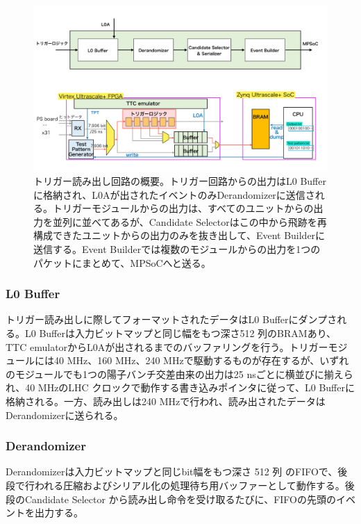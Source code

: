 \begin{figure} 
\centering
\includegraphics[width=16cm]{fig/Test/Readout_Circuite.pdf}
\caption[トリガー読み出し回路の概要]{トリガー読み出し回路の概要。トリガー回路からの出力はL0 Bufferに格納され、L0Aが出されたイベントのみDerandomizerに送信される。トリガーモジュールからの出力は、すべてのユニットからの出力を並列に並べてあるが、Candidate Selectorはこの中から飛跡を再構成できたユニットからの出力のみを抜き出して、Event Builderに送信する。Event Builderでは複数のモジュールからの出力を1つのパケットにまとめて、MPSoCへと送る。}
\label{Readout_Circuite}
\end{figure}

\subsubsection*{L0 Buffer}
    トリガー読み出しに際してフォーマットされたデータはL0 Bufferにダンプされる。L0 Bufferは入力ビットマップと同じ幅をもつ深さ512 列のBRAMあり、TTC emulatorからL0Aが出されるまでのバッファリングを行う。トリガーモジュールには40 MHz、160 MHz、240 MHzで駆動するものが存在するが、いずれのモジュールでも1つの陽子バンチ交差由来の出力は25 nsごとに横並びに揃えられ、40 MHzのLHC クロックで動作する書き込みポインタに従って、L0 Bufferに格納される。一方、読み出しは240 MHzで行われ、読み出されたデータはDerandomizerに送られる。

\subsubsection*{Derandomizer}    
    Derandomizerは入力ビットマップと同じbit幅をもつ深さ 512 列 のFIFOで、後段で行われる圧縮およびシリアル化の処理待ち用バッファーとして動作する。後段のCandidate Selector から読み出し命令を受け取るたびに、FIFOの先頭のイベントを出力する。

